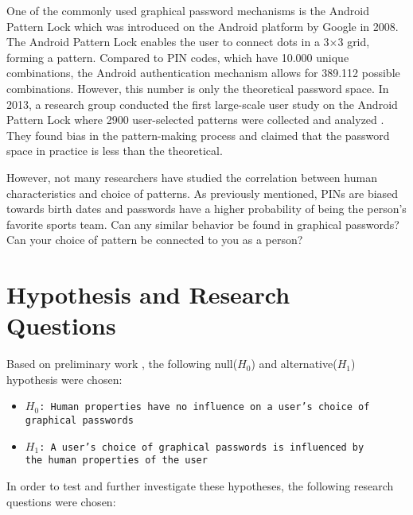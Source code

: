     One of the commonly used graphical password mechanisms is the Android Pattern Lock which was introduced on the Android platform by Google in 2008. The Android Pattern Lock enables the user to connect dots in a 3$\times$3 grid, forming a pattern. Compared to PIN codes, which have 10.000 unique combinations, the Android authentication mechanism allows for 389.112 possible combinations. However, this number is only the theoretical password space. In 2013, a research group conducted the first large-scale user study on the Android Pattern Lock where 2900 user-selected patterns were collected and analyzed \cite{Uellenbeck}. They found bias in the pattern-making process and claimed that the password space in practice is less than the theoretical.

    However, not many researchers have studied the correlation between human characteristics and choice of patterns. As previously mentioned, PINs are biased towards birth dates and passwords have a higher probability of being the person's favorite sports team. Can any similar behavior be found in graphical passwords? Can your choice of pattern be connected to you as a person?

  \section{Hypothesis and Research Questions}\label{sec:hypothesis}
    Based on preliminary work \cite{prosjektoppgave}, the following null($H_0$) and alternative($H_1$) hypothesis were chosen:

    {\renewcommand\labelitemi{}
      \begin{itemize}
        \item \texttt{$H_{0}$: Human properties have no influence on a user's choice of \\graphical passwords}
        \item \texttt{$H_{1}$: A user's choice of graphical passwords is influenced by \\the human properties of the user}
      \end{itemize}
    }
    
    In order to test and further investigate these hypotheses, the following research questions were chosen:

